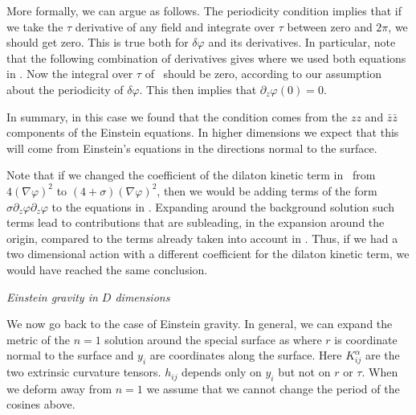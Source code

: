More formally, we can argue as follows. The periodicity condition implies that
  if we take  the  $\tau$ derivative of any field  and integrate over $\tau$ between zero and $2\pi$, we
should get zero. This is true both for $\delta \varphi$ and its derivatives. In particular, note that the
following combination of derivatives gives
\eqn{}
 where we used both equations in  \condc . Now the integral over $\tau$ of \comin\ should be zero, according to our assumption
 about the periodicity of $\delta \varphi$. This then implies that $\partial_z \varphi(0) =0 $.




In summary, in this case we found that the condition comes from the $zz$ and $\bar z \bar z$ components of the
 Einstein equations.
In higher dimensions we expect that this will come from Einstein's equations in the directions normal to the surface.

Note that if we changed the coefficient of the dilaton kinetic term in \twoddg\ from $4 (\nabla \varphi)^2 $ to
$ (4 + \sigma ) (\nabla \varphi)^2$, then we would be adding terms of the form $\sigma \partial_z \varphi
\partial_z \varphi$ to the equations in \dilgra . Expanding around the background solution such terms lead
to contributions that are subleading, in the expansion around the origin, compared to the terms already taken into
account in \condc . Thus, if we had a two dimensional action with a different coefficient for the dilaton kinetic
term, we would have reached the same conclusion.

{\it Einstein gravity in $D$ dimensions }

We now go back to the case of Einstein gravity.
In general, we can expand the metric of the $n=1$ solution  around the special surface as
\eqn{}
 where $r$ is coordinate normal to the surface and $y_i$ are coordinates along the surface. Here $K^\alpha_{ij}$ are
 the two extrinsic curvature tensors. $h_{ij}$ depends only on $y_i$ but not on $r$ or $\tau$.
 When we deform away from $n=1$ we assume that we cannot change the period of the cosines above.

